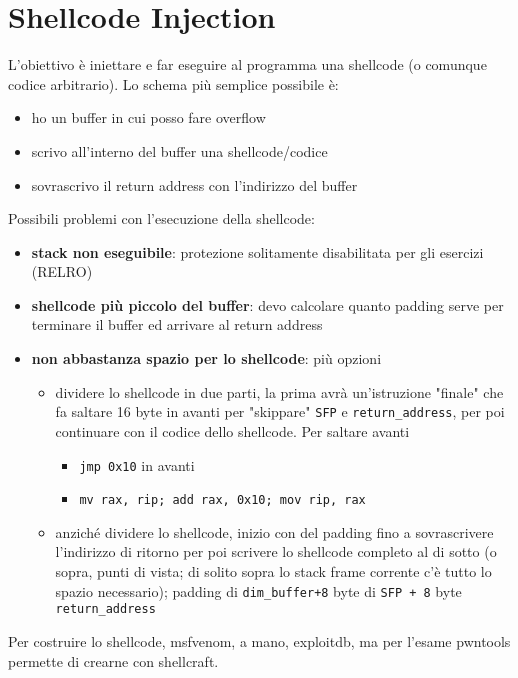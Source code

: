 
\section{Shellcode Injection}

L'obiettivo è iniettare e far eseguire al programma una shellcode (o comunque codice arbitrario). Lo schema più semplice possibile è:
\begin{itemize}
	\item ho un buffer in cui posso fare overflow
	\item scrivo all'interno del buffer una shellcode/codice
	\item sovrascrivo il return address con l'indirizzo del buffer
\end{itemize}

Possibili problemi con l'esecuzione della shellcode: 
\begin{itemize}
	\item \textbf{stack non eseguibile}: protezione solitamente disabilitata per gli esercizi (RELRO)
	\item \textbf{shellcode più piccolo del buffer}: devo calcolare quanto padding serve per terminare il buffer ed arrivare al return address
	\item \textbf{non abbastanza spazio per lo shellcode}: più opzioni
	\begin{itemize}
		\item dividere lo shellcode in due parti, la prima avrà un'istruzione "finale" che fa saltare 16 byte in avanti per "skippare" \texttt{SFP} e \texttt{return\_address}, per poi continuare con il codice dello shellcode. Per saltare avanti
		\begin{itemize}
			\item \texttt{jmp 0x10} in avanti
			\item \texttt{mv rax, rip; add rax, 0x10; mov rip, rax}
		\end{itemize}
		\item anziché dividere lo shellcode, inizio con del padding fino a sovrascrivere l'indirizzo di ritorno per poi scrivere lo shellcode completo al di sotto (o sopra, punti di vista; di solito sopra lo stack frame corrente c'è tutto lo spazio necessario); padding di \texttt{dim\_buffer+8} byte di \texttt{SFP + 8} byte \texttt{return\_address}
	\end{itemize}
\end{itemize}

Per costruire lo shellcode, msfvenom, a mano, exploitdb, ma per l'esame pwntools permette di crearne con shellcraft.
